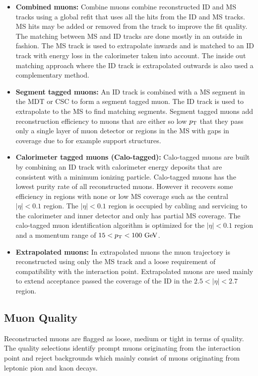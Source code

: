 \begin{itemize}
\item[] {\bf Combined muons:}  Combine muons combine reconstructed ID and MS tracks using a global refit that uses all the hits from the ID and MS tracks.  MS hits may be added or removed from the track to improve the fit quality.  The matching between MS and ID tracks are done mostly in an outside in fashion.  The MS track is used to extrapolate inwards and is matched to an ID track with energy loss in the calorimeter taken into account.  The inside out matching approach where the ID track is extrapolated outwards is also used a complementary method. 
\item[] {\bf Segment tagged muons:}  An ID track is combined with a MS segment in the MDT or CSC to form a segment tagged muon.  The ID track is used to extrapolate to the MS to find matching segments.  Segment tagged muons add reconstruction efficiency to muons that are either so low $p_{\mathrm{T}}$ that they pass only a single layer of muon detector or regions in the MS with gaps in coverage due to for example support structures. 
\item[] {\bf Calorimeter tagged muons (Calo-tagged):}  Calo-tagged muons are built by combining an ID track with calorimeter energy deposits that are consistent with a minimum ionizing particle.  Calo-tagged muons has the lowest purity rate of all reconstructed muons.  However it recovers some efficiency in regions with none or low MS coverage such as the central $|\eta| < 0.1$ region.  The $|\eta| < 0.1$ region is occupied by cabling and servicing to the calorimeter and inner detector and only has partial MS coverage.  The calo-tagged muon identification algorithm is optimized for the $|\eta| < 0.1$ region and a momentum range of $15 < \pt < 100 \gev$.
\item[] {\bf Extrapolated muons:}  In extrapolated muons the muon trajectory is reconstructed using only the MS track and a loose requirement of compatibility with the interaction point.  Extrapolated muons are used mainly to extend acceptance passed the coverage of the ID in the $2.5 < |\eta| < 2.7$ region.
\end{itemize}

\subsection{Muon Quality}
\label{sec:reco:MuonQuality}

\indent Reconstructed muons are flagged as loose, medium or tight in terms of quality.  The quality selections identify prompt muons originating from the interaction point and reject backgrounds which mainly consist of muons originating from leptonic pion and kaon decays. \\


